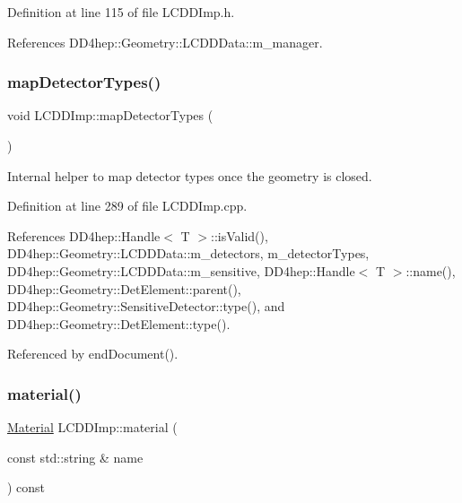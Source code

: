 Definition at line 115 of file L\+C\+D\+D\+Imp.\+h.



References D\+D4hep\+::\+Geometry\+::\+L\+C\+D\+D\+Data\+::m\+\_\+manager.

\hypertarget{class_d_d4hep_1_1_geometry_1_1_l_c_d_d_imp_ade5422f804607ee686022a4a05bd3cff}{}\label{class_d_d4hep_1_1_geometry_1_1_l_c_d_d_imp_ade5422f804607ee686022a4a05bd3cff} 
\subsubsection{\texorpdfstring{map\+Detector\+Types()}{mapDetectorTypes()}}
{\footnotesize\ttfamily void L\+C\+D\+D\+Imp\+::map\+Detector\+Types (\begin{DoxyParamCaption}{ }\end{DoxyParamCaption})\hspace{0.3cm}{\ttfamily [private]}}



Internal helper to map detector types once the geometry is closed. 



Definition at line 289 of file L\+C\+D\+D\+Imp.\+cpp.



References D\+D4hep\+::\+Handle$<$ T $>$\+::is\+Valid(), D\+D4hep\+::\+Geometry\+::\+L\+C\+D\+D\+Data\+::m\+\_\+detectors, m\+\_\+detector\+Types, D\+D4hep\+::\+Geometry\+::\+L\+C\+D\+D\+Data\+::m\+\_\+sensitive, D\+D4hep\+::\+Handle$<$ T $>$\+::name(), D\+D4hep\+::\+Geometry\+::\+Det\+Element\+::parent(), D\+D4hep\+::\+Geometry\+::\+Sensitive\+Detector\+::type(), and D\+D4hep\+::\+Geometry\+::\+Det\+Element\+::type().



Referenced by end\+Document().

\hypertarget{class_d_d4hep_1_1_geometry_1_1_l_c_d_d_imp_a06b992f774fb1bfbd41ba41daab42ef4}{}\label{class_d_d4hep_1_1_geometry_1_1_l_c_d_d_imp_a06b992f774fb1bfbd41ba41daab42ef4} 
\subsubsection{\texorpdfstring{material()}{material()}}
{\footnotesize\ttfamily \hyperlink{class_d_d4hep_1_1_geometry_1_1_material}{Material} L\+C\+D\+D\+Imp\+::material (\begin{DoxyParamCaption}\item[{const std\+::string \&}]{name }\end{DoxyParamCaption}) const\hspace{0.3cm}{\ttfamily [virtual]}}




